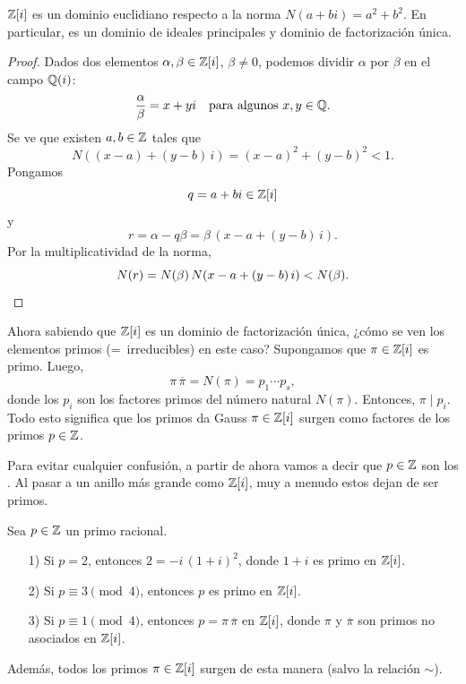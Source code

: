 \begin{lema}
  $\mathbb{Z} [i]$ es un dominio euclidiano respecto a la norma
  $N (a + bi) = a^2 + b^2$. En particular, es un dominio de ideales principales
  y dominio de factorización única.

  \begin{proof}
    Dados dos elementos $\alpha,\beta \in \mathbb{Z} [i]$, $\beta \ne 0$, podemos
    dividir $\alpha$ por $\beta$ en el campo $\mathbb{Q} (i)$:
    $$\frac{\alpha}{\beta} = x + yi \quad \text{para algunos }x,y\in \mathbb{Q}.$$
    Se ve que existen $a,b\in\mathbb{Z}$ tales que
    $$N ((x-a) + (y-b)\,i) = (x-a)^2 + (y-b)^2 < 1.$$
    Pongamos
    $$q = a + bi \in \mathbb{Z} [i]$$
    y
    $$r = \alpha - q\beta = \beta\,(x-a + (y-b)\,i).$$
    Por la multiplicatividad de la norma,
    \[ N (r) = N (\beta)\,N (x - a + (y-b)\,i) < N (\beta). \qedhere \]
  \end{proof}
\end{lema}

Ahora sabiendo que $\mathbb{Z} [i]$ es un dominio de factorización única, ¿cómo se ven
los elementos primos (=~irreducibles) en este caso? Supongamos que
$\pi \in \mathbb{Z} [i]$ es primo. Luego,
$$\pi \, \overline{\pi} = N (\pi) = p_1\cdots p_s,$$
donde los $p_i$ son los factores primos del número natural $N (\pi)$. Entonces,
$\pi \mid p_i$. Todo esto significa que los primos da Gauss $\pi \in \mathbb{Z} [i]$
surgen como factores de los primos $p \in \mathbb{Z}$.

Para evitar cualquier confusión, a partir de ahora vamos a decir que $p\in \mathbb{Z}$
son los . Al pasar a un anillo más grande como
$\mathbb{Z} [i]$, muy a menudo estos dejan de ser primos.

\begin{proposicion}
  Sea $p \in \mathbb{Z}$ un primo racional.

  \begin{itemize}
  \item[1)] Si $p = 2$, entonces $2 = -i\,(1+i)^2$, donde $1+i$ es primo
    en $\mathbb{Z} [i]$.

  \item[2)] Si $p \equiv 3 \pmod{4}$, entonces $p$ es primo en $\mathbb{Z} [i]$.

  \item[3)] Si $p \equiv 1 \pmod{4}$, entonces $p = \pi\,\overline{\pi}$
    en $\mathbb{Z} [i]$, donde $\pi$ y $\overline{\pi}$ son primos no asociados
    en $\mathbb{Z} [i]$.
  \end{itemize}

  Además, todos los primos $\pi \in \mathbb{Z} [i]$ surgen de esta manera
  (salvo la relación $\sim$).
\end{proposicion}

